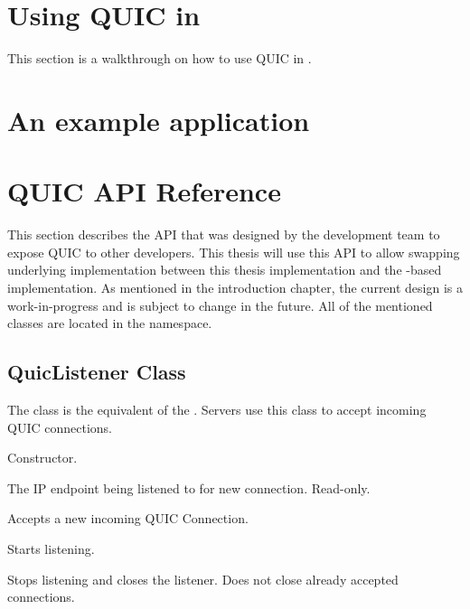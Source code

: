 \section{Using QUIC in \dotnet{}}

This section is a walkthrough on how to use QUIC in \dotnet{}.


\section{An example application}


\section{QUIC API Reference}\label{sec:06-api}

This section describes the API that was designed by the \dotnet{} development team to expose QUIC to
other developers. This thesis will use this API to allow swapping underlying implementation between
this thesis implementation and the \libmsquic{}-based implementation. As mentioned in the
introduction chapter, the current design is a work-in-progress and is subject to change in the
future. All of the mentioned classes are located in the  namespace.

\subsection{QuicListener Class}

The  class is the equivalent of the . Servers use this
class to accept incoming QUIC connections.

\begin{description}

     Constructor.

     The IP endpoint being listened to for new connection. Read-only.

    Accepts a new incoming QUIC Connection.

     Starts listening.

     Stops listening and closes the listener. Does not close already accepted connections.

\end{description}

